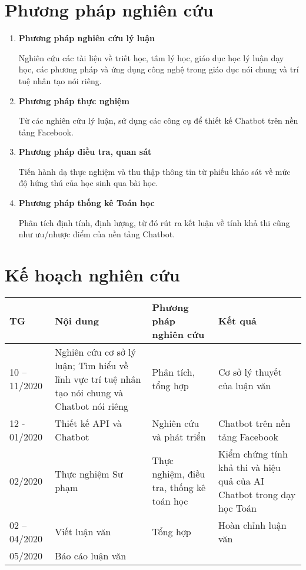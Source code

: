 \section{Phương pháp nghiên cứu}
\begin{enumerate}[label=\textbf{\thesection.\arabic*.},align=left,left=0cm..1cm]
	\item \textbf{Phương pháp nghiên cứu lý luận}\par
	Nghiên cứu các tài liệu về triết học, tâm lý học, giáo dục học lý luận dạy học, các phương pháp và ứng dụng công nghệ trong giáo dục nói chung và trí tuệ nhân tạo nói riêng.
	\item \textbf{Phương pháp thực nghiệm} \par
	Từ các nghiên cứu lý luận, sử dụng các công cụ để thiết kế Chatbot trên nền tảng Facebook.
	\item \textbf{Phương pháp điều tra, quan sát} \par
	Tiến hành dạ thực nghiệm và thu thập thông tin từ phiếu khảo sát về mức độ hứng thú của học sinh qua bài học.
	\item \textbf{Phương pháp thống kê Toán học} \par
	Phân tích định tính, định lượng, từ đó rút ra kết luận về tính khả thi cũng như ưu/nhược điểm của nền tảng Chatbot.
\end{enumerate}
\section{Kế hoạch nghiên cứu}
\begin{tabular}{|p{.1\linewidth}|p{.35\linewidth}|p{.2\linewidth}|p{.25\linewidth}|}
	\hline
	\textbf{TG} & \textbf{Nội dung} & \textbf{Phương pháp nghiên cứu} & \textbf{Kết quả} \\
	\hline
	10 – 11/2020 & Nghiên cứu cơ sở lý luận; Tìm hiểu về lĩnh vực trí tuệ nhân tạo nói chung và Chatbot nói riêng & Phân tích, tổng hợp & Cơ sở lý thuyết của luận văn \\
	\hline
	12 - 01/2020 & Thiết kế API và Chatbot & Nghiên cứu và phát triển & Chatbot trên nền tảng Facebook \\
	\hline
	02/2020 & Thực nghiệm Sư phạm & Thực nghiệm, điều tra, thống kê toán học & Kiểm chứng tính khả thi và hiệu quả của AI Chatbot trong dạy học Toán \\
	\hline
	02 – 04/2020 & Viết luận văn & Tổng hợp & Hoàn chỉnh luận văn \\
	\hline
	05/2020 & Báo cáo luận văn & & \\
	\hline
\end{tabular}
